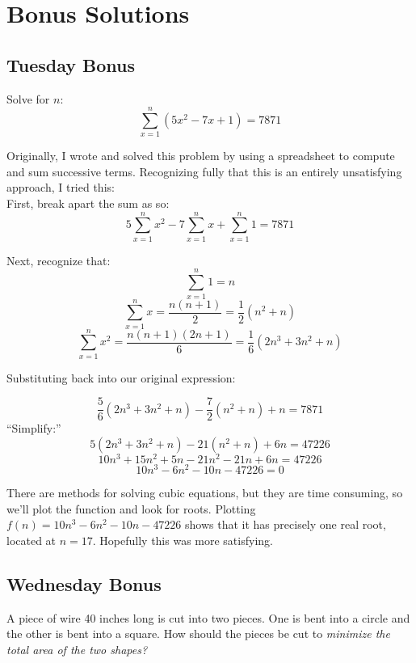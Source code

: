 \documentclass[11pt]{article}
\theoremstyle{definition}
\theoremstyle{remark}
\begin{document}
\newpage

\section*{Bonus Solutions}
\subsection*{Tuesday Bonus}
Solve for $n$:
$$\sum_{x=1}^{n} (5x^2 -7x + 1) = 7871 $$

{\color{red} Originally, I wrote and solved this problem by using a spreadsheet to compute and sum successive terms. Recognizing fully that this is an entirely unsatisfying approach, I tried this:\\

First, break apart the sum as so:
$$5\sum^n_{x=1}x^2 -7\sum_{x=1}^n x + \sum_{x=1}^n 1 = 7871$$

Next, recognize that:
$$\sum_{x=1}^n 1 = n$$
$$\sum_{x=1}^n x = \frac{n(n+1)}{2} = \frac{1}{2}(n^2+n)$$
$$\sum_{x=1}^n x^2 = \frac{n(n+1)(2n+1)}{6} = \frac{1}{6}(2n^3+3n^2+n)$$

Substituting back into our original expression:

$$\frac{5}{6} (2n^3+3n^2+n)-\frac{7}{2}(n^2 + n) + n = 7871$$
``Simplify:''
$$5(2n^3+3n^2+n)-21(n^2 + n) + 6n = 47226$$
$$10n^3+15n^2+5n-21n^2 -21n + 6n = 47226$$
$$ 10n^3-6n^2-10n-47226 = 0$$

There are methods for solving cubic equations, but they are time consuming, so we'll plot the function and look for roots. Plotting $f(n)= 10n^3-6n^2-10n-47226$ shows that it has precisely one real root, located at $n=17$. Hopefully this was more satisfying.
}

\newpage

\subsection*{Wednesday Bonus}
A piece of wire 40 inches long is cut into two pieces.  One is bent into a circle and the other is bent into a square.  How should the pieces be cut to \em minimize \em the total area of the two shapes?
\end{document}
